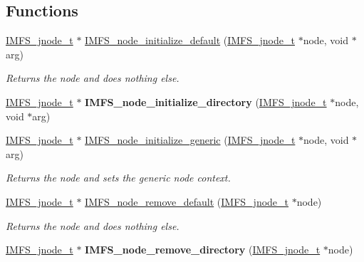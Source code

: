 \subsection*{Functions}
\begin{DoxyCompactItemize}
\item 
\mbox{\hyperlink{structIMFS__jnode__tt}{I\+M\+F\+S\+\_\+jnode\+\_\+t}} $\ast$ \mbox{\hyperlink{group__IMFSGenericNodes_gab52e16c2a7d9bac5234d44954a044f24}{I\+M\+F\+S\+\_\+node\+\_\+initialize\+\_\+default}} (\mbox{\hyperlink{structIMFS__jnode__tt}{I\+M\+F\+S\+\_\+jnode\+\_\+t}} $\ast$node, void $\ast$arg)
\begin{DoxyCompactList}\small\item\em Returns the node and does nothing else. \end{DoxyCompactList}\item 
\mbox{\label{group__IMFSGenericNodes_ga858656b988dead1a9acb895c40f4aa19}} 
\mbox{\hyperlink{structIMFS__jnode__tt}{I\+M\+F\+S\+\_\+jnode\+\_\+t}} $\ast$ {\bfseries I\+M\+F\+S\+\_\+node\+\_\+initialize\+\_\+directory} (\mbox{\hyperlink{structIMFS__jnode__tt}{I\+M\+F\+S\+\_\+jnode\+\_\+t}} $\ast$node, void $\ast$arg)
\item 
\mbox{\hyperlink{structIMFS__jnode__tt}{I\+M\+F\+S\+\_\+jnode\+\_\+t}} $\ast$ \mbox{\hyperlink{group__IMFSGenericNodes_gadf9e23718e6c6b5d811c498fa1212e6d}{I\+M\+F\+S\+\_\+node\+\_\+initialize\+\_\+generic}} (\mbox{\hyperlink{structIMFS__jnode__tt}{I\+M\+F\+S\+\_\+jnode\+\_\+t}} $\ast$node, void $\ast$arg)
\begin{DoxyCompactList}\small\item\em Returns the node and sets the generic node context. \end{DoxyCompactList}\item 
\mbox{\hyperlink{structIMFS__jnode__tt}{I\+M\+F\+S\+\_\+jnode\+\_\+t}} $\ast$ \mbox{\hyperlink{group__IMFSGenericNodes_gadea493725f5f86786783f83d3c8d23db}{I\+M\+F\+S\+\_\+node\+\_\+remove\+\_\+default}} (\mbox{\hyperlink{structIMFS__jnode__tt}{I\+M\+F\+S\+\_\+jnode\+\_\+t}} $\ast$node)
\begin{DoxyCompactList}\small\item\em Returns the node and does nothing else. \end{DoxyCompactList}\item 
\mbox{\label{group__IMFSGenericNodes_ga5e5fff400f0147ce6f0df196b350df48}} 
\mbox{\hyperlink{structIMFS__jnode__tt}{I\+M\+F\+S\+\_\+jnode\+\_\+t}} $\ast$ {\bfseries I\+M\+F\+S\+\_\+node\+\_\+remove\+\_\+directory} (\mbox{\hyperlink{structIMFS__jnode__tt}{I\+M\+F\+S\+\_\+jnode\+\_\+t}} $\ast$node)

\end{DoxyCompactItemize}
